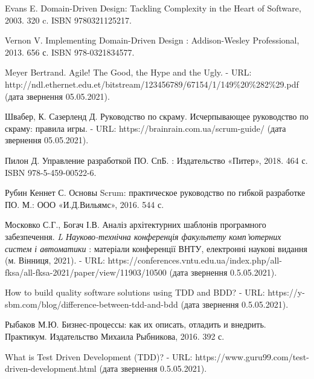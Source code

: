 \begingroup
\renewcommand{\section}[2]{\anonsection{Перелік посилань}}
\begin{thebibliography}{00}

      Evans E.
      Domain-Driven Design: Tackling Complexity in the Heart of Software,
      2003. 320 c. ISBN 9780321125217.

      Vernon V.
      Implementing Domain-Driven Design : Addison-Wesley Professional,
      2013. 656 с. ISBN 978-0321834577.

      Meyer Bertrand.
      Agile! The Good, the Hype and the Ugly. -
      URL: http://ndl.ethernet.edu.et/bitstream/123456789/67154/1/149\%20\%282\%29.pdf
      (дата звернення 05.05.2021).

      Швабер, К. Сазерленд Д.
      Руководство по скраму. Исчерпывающее руководство по скраму: правила игры. -
      URL: https://brainrain.com.ua/scrum-guide/
      (дата звернення 05.05.2021).

      Пилон Д.
      Управление разработкой ПО. СпБ. : Издательство «Питер»,
      2018. 464 с. ISBN 978-5-459-00522-6.

      Рубин Кеннет С.
      Основы Scrum: практическое руководство по гибкой разработке ПО. М.: ООО «И.Д.Вильямс»,
      2016. 544 с. 

      Московко С.Г., Богач І.В.
      Аналіз архітектурних шаблонів програмного забезпечення.
			\emph{L Науково-технічна конференція факультету комп'ютерних систем і автоматики} :
			матеріали конференції ВНТУ, електронні наукові видання (м. Вінниця, 2021).
      - URL: https://conferences.vntu.edu.ua/index.php/all-fksa/all-fksa-2021/paper/view/11903/10500
			(дата звернення 0.5.05.2021).

			How to build quality software solutions using TDD and BDD? -
			URL: https://y-sbm.com/blog/difference-between-tdd-and-bdd
			(дата звернення 0.5.05.2021).

      Рыбаков М.Ю.
      Бизнес-процессы: как их описать, отладить и внедрить. Практикум.
      Издательство Михаила Рыбникова, 2016. 392 с.

			What is Test Driven Development (TDD)? -
      URL: https://www.guru99.com/test-driven-development.html
			(дата звернення 0.5.05.2021).


\end{thebibliography}
